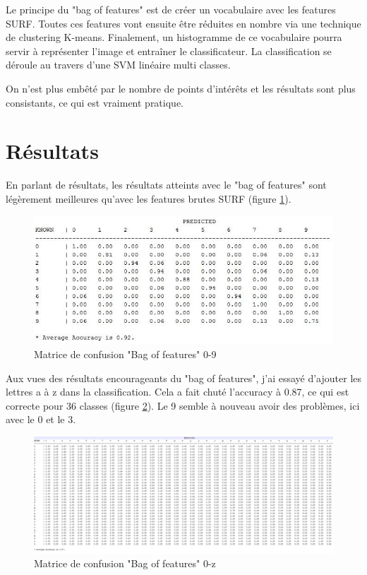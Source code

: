 Le principe du "bag of features" est de créer un vocabulaire avec les features SURF. Toutes ces features vont ensuite être réduites en nombre via une technique de clustering K-means. Finalement, un histogramme de ce vocabulaire pourra servir à représenter l'image et entraîner le classificateur. La classification se déroule au travers d'une SVM linéaire multi classes.

On n'est plus embêté par le nombre de points d'intérêts et les résultats sont plus consistants, ce qui est vraiment pratique.

\section{Résultats}

En parlant de résultats, les résultats atteints avec le "bag of features" sont légèrement meilleures qu'avec les features brutes SURF (figure \ref{fig:confusionmatrice2}).

\begin{figure}[h]
\centering
\includegraphics[width=0.8\linewidth]{pictures/bag_confusion_0-9.jpg}
\caption{Matrice de confusion "Bag of features" 0-9}
\label{fig:confusionmatrice2}
\end{figure}

Aux vues des résultats encourageants du "bag of features", j'ai essayé d'ajouter les lettres a à z dans la classification. Cela a fait chuté l'accuracy à 0.87, ce qui est correcte pour 36 classes (figure \ref{fig:confusionmatrice3}). Le 9 semble à nouveau avoir des problèmes, ici avec le 0 et le 3.

\begin{figure}[h]
\centering
\includegraphics[width=0.8\linewidth]{pictures/bag_confusion_0-z.jpg}
\caption{Matrice de confusion "Bag of features" 0-z}
\label{fig:confusionmatrice3}
\end{figure}

